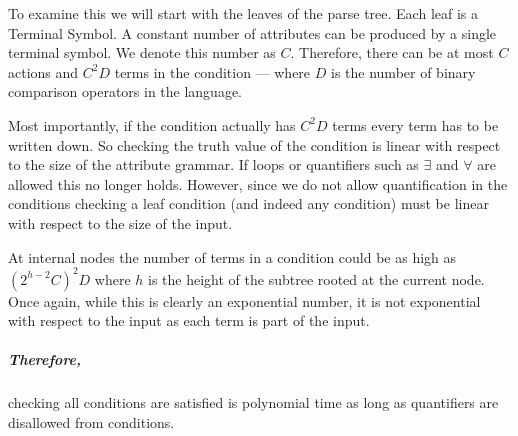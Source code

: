 To examine this we will start with the leaves of the parse tree. Each
leaf is a Terminal Symbol. A constant number of attributes can be
produced by a single terminal symbol. We denote this number as $C$.
Therefore, there can be at most $C$ actions and $C^2 D$ terms in the
condition --- where $D$ is the number of binary comparison operators in
the language.

Most importantly, if the condition actually has $C^2 D$ terms every term
has to be written down. So checking the truth value of the condition is
linear with respect to the size of the attribute grammar. If loops or
quantifiers such as $\exists$ and $\forall$ are allowed this no longer
holds. However, since we do not allow quantification in the conditions
checking a leaf condition (and indeed any condition) must be linear with
respect to the size of the input.

At internal nodes the number of terms in a condition could be as high as
$(2^{h-2}C)^2 D$ where $h$ is the height of the subtree rooted at the
current node. Once again, while this is clearly an exponential number,
it is not exponential with respect to the input as each term is part of
the input.

\subparagraph{Therefore,}

checking all conditions are satisfied is polynomial time as long as
quantifiers are disallowed from conditions.

